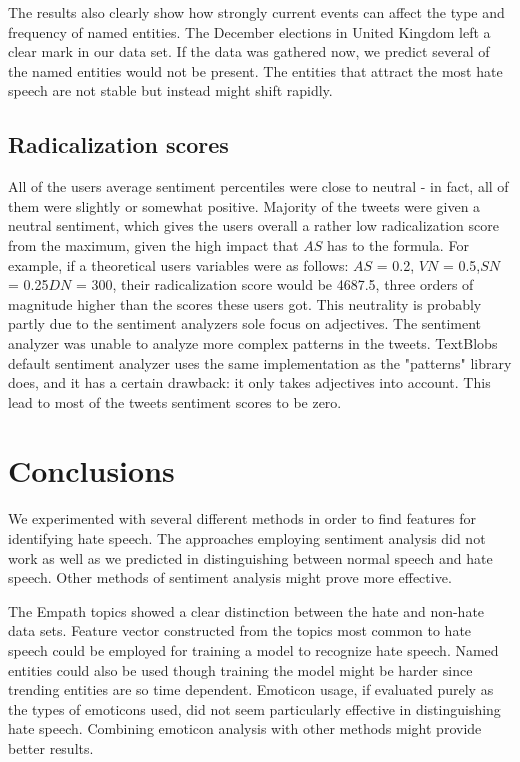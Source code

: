 \documentclass[conference]{IEEEtran}
\begin{document}
The results also clearly show how strongly current events can affect the type and 
frequency of named entities. The December elections in United Kingdom left a clear mark in our 
data set. If the data was gathered now, we predict several of the named entities would not be 
present. The entities that attract the most hate speech are not stable but instead might shift rapidly.

\subsection{Radicalization scores}
All of the users average sentiment percentiles were close to neutral - in fact,
all of them were slightly or somewhat positive. 
Majority of the tweets were given a neutral sentiment, which gives the users overall
a rather low radicalization score from the maximum, given the high impact that \(AS\)
has to the formula. For example, if a theoretical users variables were as follows: \(AS\) = 0.2,
\(VN\) = 0.5,\(SN\) = 0.25\(DN\) = 300, their radicalization score would be 4687.5, three orders
of magnitude higher than the scores these users got. This neutrality 
is probably partly due to the sentiment analyzers sole focus on adjectives. The sentiment analyzer
was unable to analyze more complex patterns in the tweets.
TextBlobs default sentiment analyzer uses the same implementation as the "patterns" library does,
and it has a certain drawback: it only takes adjectives into account. This lead to most of the 
tweets sentiment scores to be zero.

\section{Conclusions}
We experimented with several different methods in order to find features for identifying hate speech.
The approaches employing sentiment analysis did not work as well as we predicted in distinguishing between 
normal speech and hate speech. Other methods of sentiment analysis might prove more effective.

The Empath topics showed a clear distinction between the hate and non-hate data sets. Feature vector
constructed from the topics most common to hate speech could be employed for training a model to recognize 
hate speech. Named entities could also be used though training the model might be harder since 
trending entities are so time dependent. Emoticon usage, if evaluated purely as the types of 
emoticons used, did not seem particularly effective in distinguishing hate speech. Combining 
emoticon analysis with other methods might provide better results.
\end{document}

